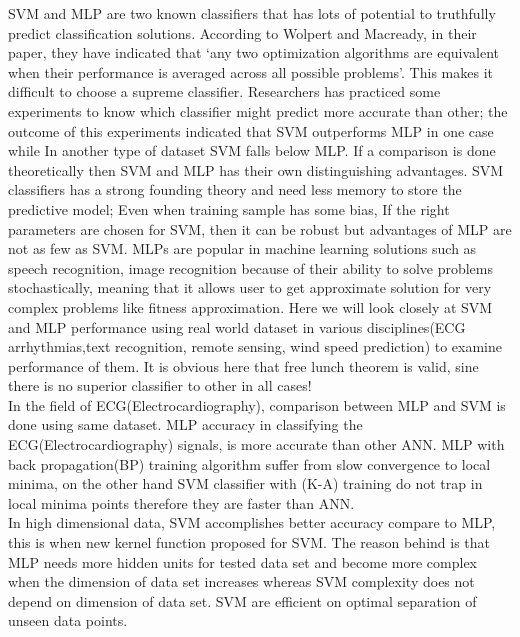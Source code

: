 SVM and MLP are two known classifiers that has lots of potential to truthfully predict classification solutions. According to Wolpert and Macready, in their paper\cite{wolpert1995no}, they have indicated that `any two optimization algorithms are equivalent when their performance is averaged across all possible problems'. This makes it difficult to choose a supreme classifier.  Researchers\cite{Moavenian20103088,Zanaty2012177} has practiced some experiments to know which classifier might predict more accurate than other; the outcome of this experiments indicated that SVM outperforms MLP in one case while In another type of dataset SVM falls below MLP. If a comparison is done theoretically then SVM and MLP has their own distinguishing advantages. SVM classifiers has a strong founding theory and need less memory to store the predictive model; Even when training sample has some bias, If the right parameters are chosen for SVM, then it can be robust\cite{auria2008support} but advantages of MLP are not as few as SVM. MLPs are popular in machine learning solutions such as speech recognition, image recognition because of their ability to solve problems stochastically, meaning that it allows user to get approximate solution for very complex problems like fitness approximation\cite{jin2005neural}. Here we will look closely at SVM and MLP performance using real world dataset in various disciplines(ECG arrhythmias,text recognition, remote sensing, wind speed prediction) to examine performance of them. It is obvious here that free lunch theorem\cite{wolpert1995no} is valid, sine there is no superior classifier to other in all cases!\\
In the field of ECG(Electrocardiography), comparison between MLP and SVM is done using same dataset. MLP accuracy in classifying the ECG(Electrocardiography) signals, is more accurate than other ANN. MLP with back propagation(BP) training algorithm suffer from slow convergence to local minima, on the other hand SVM classifier with (K-A) training do not trap in local minima points therefore they are faster than ANN\cite{Moavenian20103088}.\\
 In high dimensional data, SVM accomplishes better accuracy compare to MLP, this is when new kernel function proposed for SVM. The reason behind is that MLP needs more hidden units for tested data set and become more complex when the dimension of data set increases whereas SVM complexity does not depend on dimension of data set. SVM are efficient on optimal separation of unseen data points\cite{Zanaty2012177}.\\
